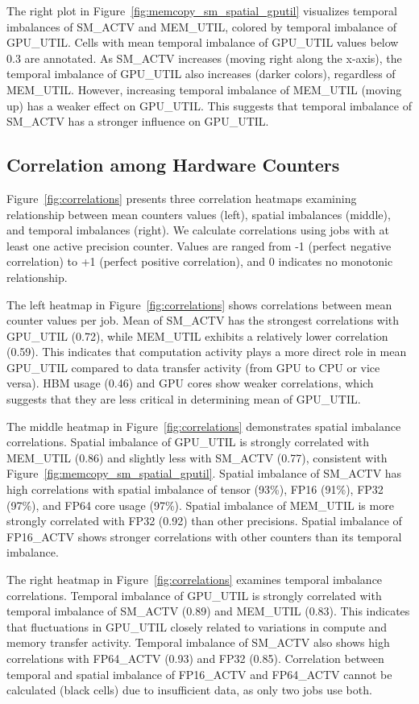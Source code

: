 The right plot in Figure~\ref{fig:memcopy_sm_spatial_gputil} visualizes
temporal imbalances of SM\_ACTV and MEM\_UTIL, colored by temporal imbalance
of GPU\_UTIL. Cells with mean temporal imbalance of GPU\_UTIL values
below 0.3 are annotated. As SM\_ACTV increases (moving right along the x-axis),
the temporal imbalance of GPU\_UTIL also increases (darker colors), regardless of
MEM\_UTIL. However, increasing temporal imbalance of MEM\_UTIL (moving up) has
a weaker effect on GPU\_UTIL. This suggests that temporal imbalance
of SM\_ACTV has a stronger influence on GPU\_UTIL.

\subsection{Correlation among Hardware Counters}

Figure~\ref{fig:correlations} presents three correlation
heatmaps examining relationship between mean counters values (left),
spatial imbalances (middle), and temporal imbalances (right). We calculate
correlations using jobs with at least one active precision counter.
Values are ranged from -1 (perfect negative correlation) to +1 (perfect
positive correlation), and 0 indicates no monotonic relationship.

The left heatmap in Figure~\ref{fig:correlations} shows correlations
between mean counter values per job. Mean of SM\_ACTV
has the strongest correlations with GPU\_UTIL (0.72), while MEM\_UTIL
exhibits a relatively lower correlation (0.59). This indicates that
computation activity plays a more direct role in mean GPU\_UTIL compared
to data transfer activity (from GPU to CPU or vice versa). HBM usage (0.46)
and GPU cores show weaker correlations, which suggests that
they are less critical in determining mean of GPU\_UTIL.

The middle heatmap in Figure~\ref{fig:correlations} demonstrates spatial imbalance
correlations. Spatial imbalance of GPU\_UTIL is strongly correlated with MEM\_UTIL
(0.86) and slightly less with SM\_ACTV (0.77), consistent with
Figure~\ref{fig:memcopy_sm_spatial_gputil}. Spatial imbalance of SM\_ACTV
has high correlations with spatial imbalance of tensor (93\%), FP16 (91\%),
FP32 (97\%), and FP64 core usage (97\%). Spatial imbalance of MEM\_UTIL is more
strongly correlated with FP32 (0.92) than other precisions. Spatial imbalance of
FP16\_ACTV shows stronger correlations with other counters than its temporal
imbalance.

The right heatmap in Figure~\ref{fig:correlations} examines temporal imbalance
correlations. Temporal imbalance of GPU\_UTIL is strongly correlated
with temporal imbalance of SM\_ACTV (0.89) and MEM\_UTIL (0.83). This
indicates that fluctuations in GPU\_UTIL closely related to variations in compute
and memory transfer activity. Temporal imbalance of SM\_ACTV also shows
high correlations with FP64\_ACTV (0.93) and FP32 (0.85).
Correlation between temporal and spatial imbalance of FP16\_ACTV and FP64\_ACTV
cannot be calculated (black cells) due to insufficient data, as only two jobs use both.
